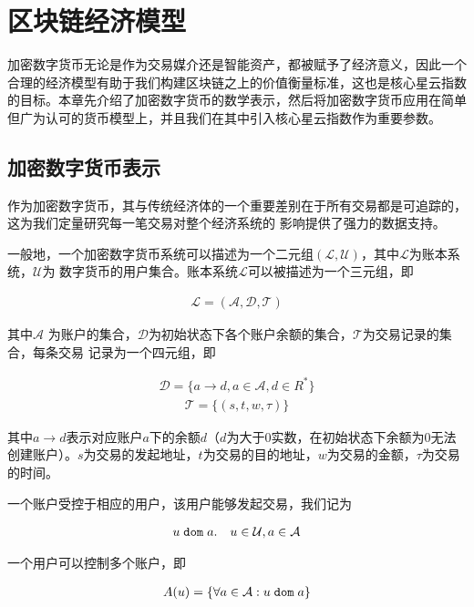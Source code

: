 \section{区块链经济模型}
加密数字货币无论是作为交易媒介还是智能资产，都被赋予了经济意义，因此一个合理的经济模型有助于我们构建区块链之上的价值衡量标准，这也是核心星云指数的目标。本章先介绍了加密数字货币的数学表示，然后将加密数字货币应用在简单但广为认可的货币模型上，并且我们在其中引入核心星云指数作为重要参数。

\subsection{加密数字货币表示}
作为加密数字货币，其与传统经济体的一个重要差别在于所有交易都是可追踪的，这为我们定量研究每一笔交易对整个经济系统的
影响提供了强力的数据支持。

一般地，一个加密数字货币系统可以描述为一个二元组$(\mathcal{L}, \mathcal{U})$，其中$\mathcal{L}$为账本系统，$\mathcal{U}$为
数字货币的用户集合。账本系统$\mathcal{L}$可以被描述为一个三元组，即

\begin{align}
\mathcal{L} = (\mathcal{A}, \mathcal{D}, \mathcal{T})
\end{align}

\noindent 其中$\mathcal{A}$ 为账户的集合，$\mathcal{D}$为初始状态下各个账户余额的集合，$\mathcal{T}$为交易记录的集合，每条交易
记录为一个四元组，即

\begin{align}
\mathcal{D} = \{a \rightarrow d, a{\in}\mathcal{A}, d{\in}R^*\}
\end{align}
\begin{align}
\mathcal{T} = \{(s, t, w, \tau)\}
\end{align}

\noindent 其中$a \rightarrow d$表示对应账户$a$下的余额$d$（$d$为大于0实数，在初始状态下余额为0无法创建账户）。$s$为交易的发起地址，$t$为交易的目的地址，$w$为交易的金额，$\tau$为交易的时间。

一个账户受控于相应的用户，该用户能够发起交易，我们记为

\begin{align}
u {\; \texttt{dom}\;} a. \quad u\in \mathcal{U}, a\in \mathcal{A}
\end{align}

\noindent 一个用户可以控制多个账户，即

\begin{align}
A(u) = \{\forall a\in \mathcal{A} : u {\; \texttt{dom}\;} a\}
\end{align}

